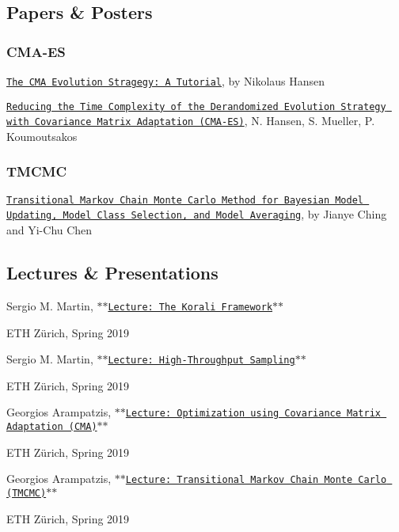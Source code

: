 \subsection*{Papers \& Posters}

\subsubsection*{C\-M\-A-\/\-E\-S}

\href{https://github.com/AlexanderFabisch/CMA-ESpp}{\tt The C\-M\-A Evolution Stragegy\-: A Tutorial}, by Nikolaus Hansen

\href{https://www.mitpressjournals.org/doi/10.1162/106365603321828970}{\tt Reducing the Time Complexity of the Derandomized Evolution Strategy with Covariance Matrix Adaptation (C\-M\-A-\/\-E\-S)}, N. Hansen, S. Mueller, P. Koumoutsakos

\subsubsection*{T\-M\-C\-M\-C}

\href{https://ascelibrary.org/doi/full/10.1061/%28ASCE%290733-9399%282007%29133%3A7%28816%29}{\tt Transitional Markov Chain Monte Carlo Method for Bayesian Model Updating, Model Class Selection, and Model Averaging}, by Jianye Ching and Yi-\/\-Chu Chen

\subsection*{Lectures \& Presentations}

Sergio M. Martin, \href{https://www.cse-lab.ethz.ch/wp-content/uploads/2019/03/hpcse2-19_Lecture_Korali.pdf.pdf}{\tt $\ast$$\ast$\-Lecture\-: The Korali Framework$\ast$$\ast$} \par
 E\-T\-H Zürich, Spring 2019

Sergio M. Martin, \href{https://www.cse-lab.ethz.ch/wp-content/uploads/2019/04/hpcse2-19_Lecture_UPC.pdf}{\tt $\ast$$\ast$\-Lecture\-: High-\/\-Throughput Sampling$\ast$$\ast$} \par
 E\-T\-H Zürich, Spring 2019

Georgios Arampatzis, \href{https://www.cse-lab.ethz.ch/wp-content/uploads/2019/03/hpcse2-19_cmaes.pdf}{\tt $\ast$$\ast$\-Lecture\-: Optimization using Covariance Matrix Adaptation (C\-M\-A)$\ast$$\ast$} \par
 E\-T\-H Zürich, Spring 2019

Georgios Arampatzis, \href{https://www.cse-lab.ethz.ch/wp-content/uploads/2019/03/hpcse2-19_tmcmc.pdf}{\tt $\ast$$\ast$\-Lecture\-: Transitional Markov Chain Monte Carlo (T\-M\-C\-M\-C)$\ast$$\ast$} \par
 E\-T\-H Zürich, Spring 2019 